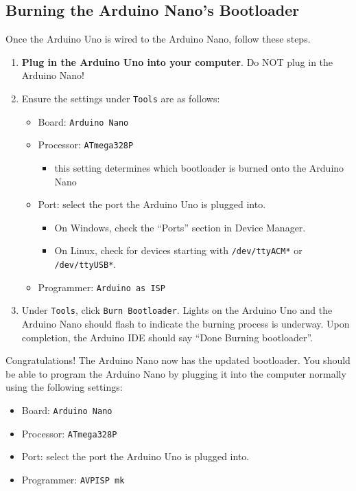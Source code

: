 \documentclass{article}
\begin{document}
\clearpage

\subsection{Burning the Arduino Nano's Bootloader}

Once the Arduino Uno is wired to the Arduino Nano, follow these steps.

\begin{enumerate}
    \item {\bf Plug in the Arduino Uno into your computer}. Do NOT plug in the Arduino Nano!
    \item Ensure the settings under \verb|Tools| are as follows:
    \begin{itemize}
        \item Board: \verb|Arduino Nano|
        \item Processor: \verb|ATmega328P| 
        \begin{itemize}
            \item this setting determines which bootloader is burned onto the Arduino Nano
        \end{itemize}
        \item Port: select the port the Arduino Uno is plugged into. 
        \begin{itemize}
            \item On Windows, check the “Ports” section in Device Manager.
            \item On Linux, check for devices starting with \verb|/dev/ttyACM*| or \verb|/dev/ttyUSB*|.
        \end{itemize}
        \item Programmer: \verb|Arduino as ISP|
    \end{itemize}
    \item Under \verb|Tools|, click \verb|Burn Bootloader|. Lights on the Arduino Uno and the Arduino Nano should flash to indicate the burning process is underway. Upon completion, the Arduino IDE should say ``Done Burning bootloader''.
\end{enumerate}

Congratulations! The Arduino Nano now has the updated bootloader. You should be able to program the Arduino Nano by plugging it into the computer normally using the following settings:

\begin{itemize}
    \item Board: \verb|Arduino Nano|
    \item Processor: \verb|ATmega328P|
    \item Port: select the port the Arduino Uno is plugged into. 
    \item Programmer: \verb|AVPISP mk|
\end{itemize}
    
\end{document}
